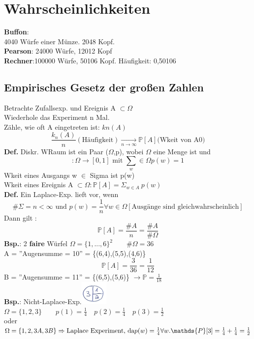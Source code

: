 \section{Wahrscheinlichkeiten}
\textbf{Buffon}:\\
4040 Würfe einer Münze. 2048 Kopf.\medskip\\
\textbf{Pearson}: 24000 Würfe, 12012 Kopf\medskip\\
\textbf{Rechner}:100000 Würfe, 50106 Kopf. Häufigkeit: 0,50106\\
\subsection{Empirisches Gesetz der großen Zahlen}
Betrachte Zufallsexp. und Ereignis A $\subset \Omega$\\
Wiederhole das Experiment n Mal.\\
Zähle, wie oft A eingetreten ist: $kn(A)$ $$\frac{k_n(A)}{n} (\text{Häufigkeit}) \underset{n\rightarrow \infty}{\rightarrow} \mathds {P}[A] \text{(Wkeit von A0)}$$ 
\textbf{Def.} Diskr. WRaum ist ein Paar ($\Omega$,p), wobei $\Omega$ eine Menge ist und
$$:\Omega \rightarrow [0,1] \text{ mit } \sum_w\in \Omega p(w) = 1$$
Wkeit eines Ausgangs w $\in$ Sigma ist p(w)\\
Wkeit eines Ereignis A $\subset \Omega : \mathds {P}[A]=\Sigma_{w\in A}\:p(w)$\medskip\\
\textbf{Def.} Ein Laplace-Exp. lieft vor, wenn 
$$\#\Sigma = n < \infty \text{ und } p(w) = \frac{1}{n}\forall w \in \Omega[\text{Ausgänge sind gleichwahrscheinlich}]$$
Dann gilt : $$\mathds {P}[A]=\frac{\#A}{n}= \frac{\#A}{\#\Omega}$$
\textbf{Bsp.}: 2 \textbf{faire} Würfel $\Omega = \{1,...,6\}^2 \qquad \#\Omega = 36$\\
A = ''Augensumme  = 10'' = \{(6,4),(5,5),(4,6)\}
$$\mathds {P}[A] = \frac{3}{36}=\frac{1}{12}$$
B = ''Augensumme = 11'' = \{(6,5),(5,6)\} $\rightarrow \mathds {P}=\frac{1}{18}$\medskip\\
\textbf{Bsp.}: Nicht-Laplace-Exp.\includegraphics[width=0.1\textwidth]{img/torte.PNG}\\
$\Omega = \{1,2,3\} \qquad p(1) = \frac{1}{4} \quad p(2)=\frac{1}{4} \quad p(3) = \frac{1}{2}$\\oder
$\Omega = \{1,2,3A,3B\} \Rightarrow \text{Laplace Experiment, da} \\ p(w) = \frac{1}{4} \forall w. \mathds {P}[3] = \frac{1}{4}+\frac{1}{4} = \frac{1}{2}$\medskip\\

